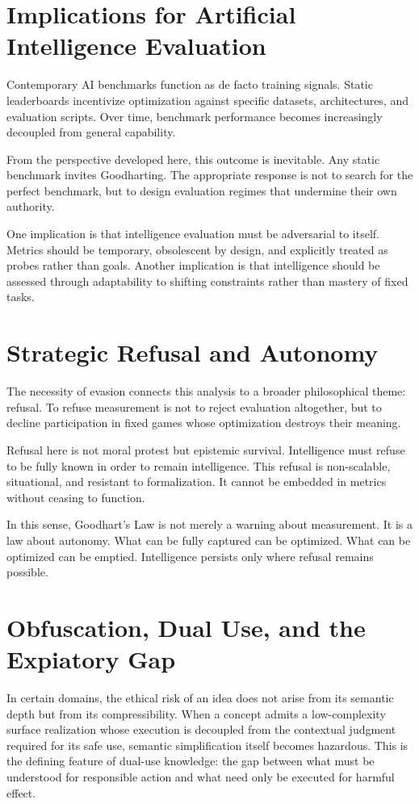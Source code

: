 \documentclass[12pt]{article}
\begin{document}
\section{Implications for Artificial Intelligence Evaluation}

Contemporary AI benchmarks function as de facto training signals. Static leaderboards incentivize optimization against specific datasets, architectures, and evaluation scripts. Over time, benchmark performance becomes increasingly decoupled from general capability.

From the perspective developed here, this outcome is inevitable. Any static benchmark invites Goodharting. The appropriate response is not to search for the perfect benchmark, but to design evaluation regimes that undermine their own authority.

One implication is that intelligence evaluation must be adversarial to itself. Metrics should be temporary, obsolescent by design, and explicitly treated as probes rather than goals. Another implication is that intelligence should be assessed through adaptability to shifting constraints rather than mastery of fixed tasks.

\section{Strategic Refusal and Autonomy}

The necessity of evasion connects this analysis to a broader philosophical theme: refusal. To refuse measurement is not to reject evaluation altogether, but to decline participation in fixed games whose optimization destroys their meaning.

Refusal here is not moral protest but epistemic survival. Intelligence must refuse to be fully known in order to remain intelligence. This refusal is non-scalable, situational, and resistant to formalization. It cannot be embedded in metrics without ceasing to function.

In this sense, Goodhart’s Law is not merely a warning about measurement. It is a law about autonomy. What can be fully captured can be optimized. What can be optimized can be emptied. Intelligence persists only where refusal remains possible.

\section{Obfuscation, Dual Use, and the Expiatory Gap}

In certain domains, the ethical risk of an idea does not arise from its semantic depth but from its compressibility. When a concept admits a low-complexity surface realization whose execution is decoupled from the contextual judgment required for its safe use, semantic simplification itself becomes hazardous. This is the defining feature of dual-use knowledge: the gap between what must be understood for responsible action and what need only be executed for harmful effect.
\end{document}
